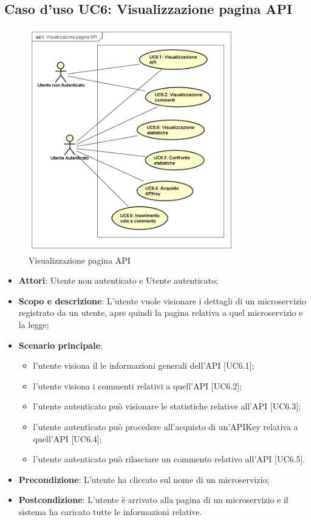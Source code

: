 \documentclass[12pt,a4paper,titlepage]{article}
\begin{document}
	\subsection{Caso d'uso UC6: Visualizzazione pagina API}
	\label{UC6}
	\begin{figure}[H]
		\centering
		\includegraphics[width=0.8\textwidth]{UseCase/VisualizzazionePaginaAPI}
		\caption{Visualizzazione pagina API}
	\end{figure}
	\begin{itemize}
		\item \textbf{Attori}: Utente non autenticato e Utente autenticato;
		\item \textbf{Scopo e descrizione}: L'utente vuole visionare i dettagli di un microservizio registrato da un utente, apre quindi la pagina relativa a quel microservizio e la legge;
		\item \textbf{Scenario principale}:
		\begin{itemize}
			\item l'utente visiona il le informazioni generali dell'API [UC6.1];
			\item l'utente visiona i commenti relativi a quell'API [UC6.2];
			\item l'utente autenticato può visionare le statistiche relative all'API [UC6.3];
			\item l'utente autenticato può procedere all'acquisto di un'APIKey relativa a quell'API [UC6.4];
			\item l'utente autenticato può rilasciare un commento relativo all'API [UC6.5].
		\end{itemize}
		\item \textbf{Precondizione}: L'utente ha cliccato sul nome di un microservizio;
		\item \textbf{Postcondizione}: L'utente è arrivato alla pagina di un microservizio e il sistema ha caricato tutte le informazioni relative.
	\end{itemize}
\end{document}
